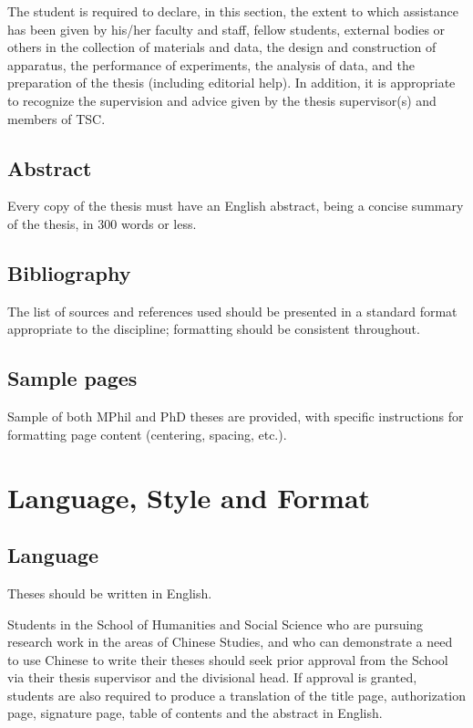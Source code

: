 The student is required to declare, in this section, the extent to which assistance has been given by his/her faculty and staff, fellow students, external bodies or others in the collection of materials and data, the design and construction of apparatus, the performance of experiments, the analysis of data, and the preparation of the thesis (including editorial help). In addition, it is appropriate to recognize the supervision and advice given by the thesis supervisor(s) and members of TSC.

\subsection{Abstract}

Every copy of the thesis must have an English abstract, being a concise summary of the thesis, in 300 words or less.

\subsection{Bibliography}

The list of sources and references used should be presented in a standard format appropriate to the discipline; formatting should be consistent throughout.

\subsection{Sample pages}

Sample of both MPhil \citep{ust_thesis_mphil} and PhD \citep{ust_thesis_phd} theses are provided, with specific instructions for formatting page content (centering, spacing, etc.).

\section{Language, Style and Format}
\subsection{Language}

Theses should be written in English.

Students in the School of Humanities and Social Science who are pursuing research work in the areas of Chinese Studies, and who can demonstrate a need to use Chinese to write their theses should seek prior approval from the School via their thesis supervisor and the divisional head. If approval is granted, students are also required to produce a translation of the title page, authorization page, signature page, table of contents and the abstract in English.

